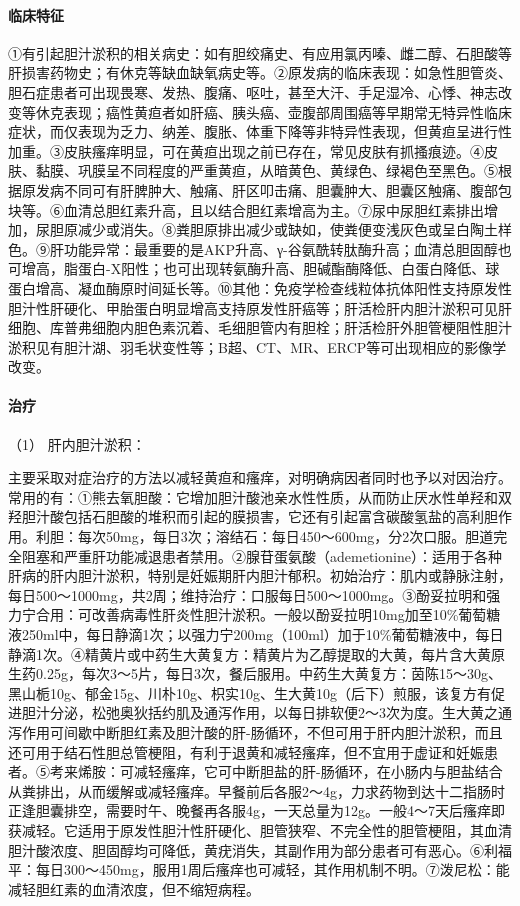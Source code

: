 \paragraph{临床特征}

①有引起胆汁淤积的相关病史：如有胆绞痛史、有应用氯丙嗪、雌二醇、石胆酸等肝损害药物史；有休克等缺血缺氧病史等。②原发病的临床表现：如急性胆管炎、胆石症患者可出现畏寒、发热、腹痛、呕吐，甚至大汗、手足湿冷、心悸、神志改变等休克表现；癌性黄疸者如肝癌、胰头癌、壶腹部周围癌等早期常无特异性临床症状，而仅表现为乏力、纳差、腹胀、体重下降等非特异性表现，但黄疸呈进行性加重。③皮肤瘙痒明显，可在黄疸出现之前已存在，常见皮肤有抓搔痕迹。④皮肤、黏膜、巩膜呈不同程度的严重黄疸，从暗黄色、黄绿色、绿褐色至黑色。⑤根据原发病不同可有肝脾肿大、触痛、肝区叩击痛、胆囊肿大、胆囊区触痛、腹部包块等。⑥血清总胆红素升高，且以结合胆红素增高为主。⑦尿中尿胆红素排出增加，尿胆原减少或消失。⑧粪胆原排出减少或缺如，使粪便变浅灰色或呈白陶土样色。⑨肝功能异常：最重要的是AKP升高、γ-谷氨酰转肽酶升高；血清总胆固醇也可增高，脂蛋白-X阳性；也可出现转氨酶升高、胆碱酯酶降低、白蛋白降低、球蛋白增高、凝血酶原时间延长等。⑩其他：免疫学检查线粒体抗体阳性支持原发性胆汁性肝硬化、甲胎蛋白明显增高支持原发性肝癌等；肝活检肝内胆汁淤积可见肝细胞、库普弗细胞内胆色素沉着、毛细胆管内有胆栓；肝活检肝外胆管梗阻性胆汁淤积见有胆汁湖、羽毛状变性等；B超、CT、MR、ERCP等可出现相应的影像学改变。

\paragraph{治疗}

\hypertarget{text00039.htmlux5cux23CHP1-16-4-4-3-1}{}
（1） 肝内胆汁淤积：

主要采取对症治疗的方法以减轻黄疸和瘙痒，对明确病因者同时也予以对因治疗。常用的有：①熊去氧胆酸：它增加胆汁酸池亲水性性质，从而防止厌水性单羟和双羟胆汁酸包括石胆酸的堆积而引起的膜损害，它还有引起富含碳酸氢盐的高利胆作用。利胆：每次50mg，每日3次；溶结石：每日450～600mg，分2次口服。胆道完全阻塞和严重肝功能减退患者禁用。②腺苷蛋氨酸（ademetionine）：适用于各种肝病的肝内胆汁淤积，特别是妊娠期肝内胆汁郁积。初始治疗：肌内或静脉注射，每日500～1000mg，共2周；维持治疗：口服每日500～1000mg。③酚妥拉明和强力宁合用：可改善病毒性肝炎性胆汁淤积。一般以酚妥拉明10mg加至10\%葡萄糖液250ml中，每日静滴1次；以强力宁200mg（100ml）加于10\%葡萄糖液中，每日静滴1次。④精黄片或中药生大黄复方：精黄片为乙醇提取的大黄，每片含大黄原生药0.25g，每次3～5片，每日3次，餐后服用。中药生大黄复方：茵陈15～30g、黑山栀10g、郁金15g、川朴10g、枳实10g、生大黄10g（后下）煎服，该复方有促进胆汁分泌，松弛奥狄括约肌及通泻作用，以每日排软便2～3次为度。生大黄之通泻作用可间歇中断胆红素及胆汁酸的肝-肠循环，不但可用于肝内胆汁淤积，而且还可用于结石性胆总管梗阻，有利于退黄和减轻瘙痒，但不宜用于虚证和妊娠患者。⑤考来烯胺：可减轻瘙痒，它可中断胆盐的肝-肠循环，在小肠内与胆盐结合从粪排出，从而缓解或减轻瘙痒。早餐前后各服2～4g，力求药物到达十二指肠时正逢胆囊排空，需要时午、晚餐再各服4g，一天总量为12g。一般4～7天后瘙痒即获减轻。它适用于原发性胆汁性肝硬化、胆管狭窄、不完全性的胆管梗阻，其血清胆汁酸浓度、胆固醇均可降低，黄疣消失，其副作用为部分患者可有恶心。⑥利福平：每日300～450mg，服用1周后瘙痒也可减轻，其作用机制不明。⑦泼尼松：能减轻胆红素的血清浓度，但不缩短病程。


